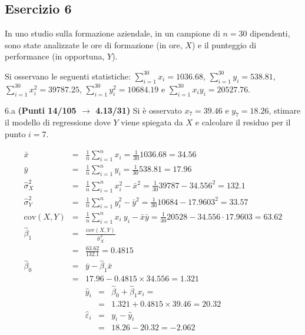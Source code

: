 \documentclass[
  11pt,
]{book}
\theoremstyle{mytheoremstyle}
\theoremstyle{mydefstyle}
\newenvironment{sol}
  {
  \begin{tcolorbox}[enhanced,breakable,arc=0.1mm,boxrule=1pt,colback=white,colframe=iblue,
  title=\bf \fontfamily{lmss}\selectfont \hspace{.5 cm} Soluzione,drop fuzzy shadow]

}{
\end{tcolorbox}
  }
\begin{document}
\subsection{Esercizio 6}\label{esercizio-6-33}

In uno studio sulla formazione aziendale, in un campione di \(n=30\) dipendenti, sono state analizzate le ore di formazione (in ore, \(X\)) e il punteggio di performance (in opportuna, \(Y\)).

Si osservano le seguenti statistiche:
\(\sum_{i=1}^{30}x_i=1036.68\), \(\sum_{i=1}^{30}y_i=538.81\),
\(\sum_{i=1}^{30}x_i^2=39787.25\), \(\sum_{i=1}^{30}y_i^2=10684.19\) e \(\sum_{i=1}^{30}x_iy_i=20527.76\).

6.a \textbf{(Punti 14/105 \(\rightarrow\) 4.13/31)} Si è osservato \(x_7=39.46\) e \(y_7=18.26\), stimare il modello di regressione dove \(Y\) viene spiegata da \(X\) e calcolare il residuo per il punto \(i=7\).

\begin{sol}
\begin{eqnarray*}
           \bar x &=&\frac 1 n\sum_{i=1}^n x_i = \frac {1}{ 30 }  1036.68 =  34.56 \\
           \bar y &=&\frac 1 n\sum_{i=1}^n y_i = \frac {1}{ 30 }  538.81 =  17.96 \\
           \hat\sigma_X^2&=&\frac 1 n\sum_{i=1}^n x_i^2-\bar x^2=\frac {1}{ 30 }  39787  - 34.556 ^2= 132.1 \\
           \hat\sigma_Y^2&=&\frac 1 n\sum_{i=1}^n y_i^2-\bar y^2=\frac {1}{ 30 }  10684  - 17.9603 ^2= 33.57 \\
           \text{cov}(X,Y)&=&\frac 1 n\sum_{i=1}^n x_i~y_i-\bar x\bar y=\frac {1}{ 30 }  20528 - 34.556 \cdot 17.9603 = 63.62 \\
           \hat\beta_1 &=& \frac{\text{cov}(X,Y)}{\hat\sigma_X^2} \\
                    &=& \frac{ 63.62 }{ 132.1 }  =  0.4815 \\
           \hat\beta_0 &=& \bar y - \hat\beta_1 \bar x\\
                    &=&  17.96 - 0.4815 \times  34.556 = 1.321 
         \end{eqnarray*}\begin{eqnarray*}
\hat y_i &=&\hat\beta_0+\hat\beta_1 x_i=\\ 
&=& 1.321 + 0.4815 \times 39.46 = 20.32 \\ 
\hat \varepsilon_i &=& y_i-\hat y_i\\ 
&=& 18.26 - 20.32 = -2.062  
\end{eqnarray*}

\end{sol}
\end{document}
